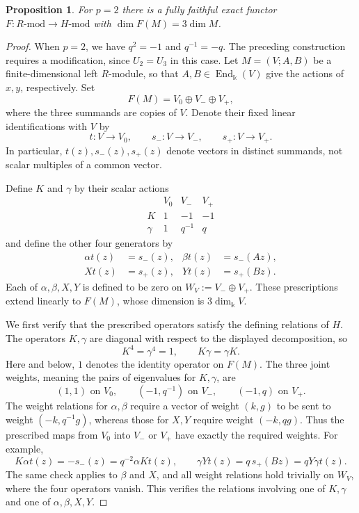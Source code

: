 \documentclass[10pt,oneside]{amsart}
\newcommand{\kk}{\Bbbk}
\newtheorem{proposition}{Proposition}[section]
\theoremstyle{definition}
\begin{document}
\begin{proposition}\label{prop:wild-p-two}
For $p=2$ there is a fully faithful exact functor $F:R\text{-mod}\to H\text{-mod}$
with $\dim F(M)=3\dim M$.
\end{proposition}
\begin{proof}
When $p=2$, we have $q^2=-1$ and $q^{-1}=-q$. The preceding
construction requires a modification, since $U_2=U_3$ in this case.
Let $M=(V;A,B)$ be a finite-dimensional left $R$-module, so that
$A,B\in\operatorname{End}_{\kk}(V)$ give the actions of $x,y$,
respectively. Set
\[
 F(M)=V_0\oplus V_-\oplus V_+,
\]
where the three summands are copies of $V$. Denote their fixed
linear identifications with $V$ by
\[
 t:V\longrightarrow V_0,\qquad
 s_-:V\longrightarrow V_-,\qquad
 s_+:V\longrightarrow V_+.
\]
In particular, $t(z),s_-(z),s_+(z)$ denote vectors in distinct
summands, not scalar multiples of a common vector.

Define $K$ and $\gamma$ by their scalar actions
\[
\begin{array}{c|ccc}
 &V_0&V_-&V_+\\\hline
 K&1&-1&-1\\
 \gamma&1&q^{-1}&q
\end{array}
\]
and define the other four generators by
\[
\begin{aligned}
 \alpha t(z)&=s_-(z),& \beta t(z)&=s_-(Az),\\
 Xt(z)&=s_+(z),& Yt(z)&=s_+(Bz).
\end{aligned}
\]
Each of $\alpha,\beta,X,Y$ is defined to be zero on
$W_V:=V_-\oplus V_+$. These prescriptions extend linearly to
$F(M)$, whose dimension is $3\dim_{\kk}V$.

We first verify that the prescribed operators satisfy the defining
relations of $H$. The operators $K,\gamma$ are diagonal with respect
to the displayed decomposition, so
\[
 K^4=\gamma^4=1,\qquad K\gamma=\gamma K.
\]
Here and below, $1$ denotes the identity operator on $F(M)$.
The three joint weights, meaning the pairs of eigenvalues for
$K,\gamma$, are
\[
 (1,1)\text{ on }V_0,\qquad
 (-1,q^{-1})\text{ on }V_-,\qquad
 (-1,q)\text{ on }V_+.
\]
The weight relations for $\alpha,\beta$ require a vector of weight
$(k,g)$ to be sent to weight $(-k,q^{-1}g)$, whereas those for
$X,Y$ require weight $(-k,qg)$. Thus the prescribed maps from
$V_0$ into $V_-$ or $V_+$ have exactly the required weights.
For example,
\[
 K\alpha t(z)=-s_-(z)=q^{-2}\alpha Kt(z),
 \qquad
 \gamma Yt(z)=q\,s_+(Bz)=qY\gamma t(z).
\]
The same check applies to $\beta$ and $X$, and all weight relations
hold trivially on $W_V$, where the four operators vanish.
This verifies the relations involving one of $K,\gamma$ and one
of $\alpha,\beta,X,Y$.


\end{proof}
\end{document}
